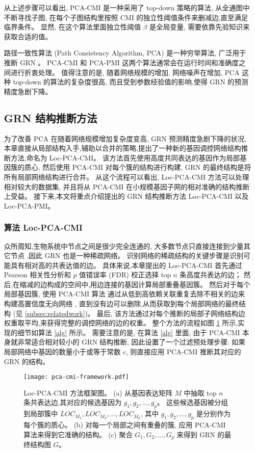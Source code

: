 从上述步骤可以看出, PCA-CMI 是一种采用了 top-down 策略的算法, 
从全通图中不断寻找子图, 在每个子图结构里按照 CMI 的独立性阈值条件来删减边,直至满足临界条件。
显然, 在这个算法里面独立性阈值 $\beta$ 是全局变量, 需要依靠先验知识来获取合适的值。

路径一致性算法 (Path Consistency Algorithm, PCA) 是一种穷举算法, 
广泛用于推断 GRN 。
PCA-CMI 和 PCA-PMI 这两个算法通常会在运行时间和准确度之间进行折衷处理。
值得注意的是, 
随着网络规模的增加, 网络噪声在增加,
PCA 这种 top-down 的算法的复杂度很高, 而且受到参数经验值的影响,使得 GRN 的预测精度急剧下降。

\subsection{GRN 结构推断方法}
为了改善 PCA 在随着网络规模增加复杂度变高, GRN 预测精度急剧下降的状况, 
本章直接从局部结构入手,辅助以合并的策略,提出了一种新的基因调控网络结构推断方法,命名为 Loc-PCA-CMI。
该方法首先使用高度共同表达的基因作为局部基因簇的质心,
然后使用 PCA-CMI 对每个簇的结构进行构建, GRN 的最终结构是将所有局部网络结构进行合并。
从这个流程可以看出, Loc-PCA-CMI 方法可以处理相对较大的数据集,
并且将从 PCA-CMI 在小规模基因子网的相对准确的结构推断上受益。
接下来,本文将重点介绍提出的 GRN 结构推断方法 Loc-PCA-CMI 以及 Loc-PCA-PMI。

\subsubsection{算法 Loc-PCA-CMI}

众所周知,生物系统中节点之间是很少完全连通的,
大多数节点只直接连接到少量其它节点 ,因此 GRN 也是一种稀疏网络。
识别网络的稀疏结构的关键步骤是识别可能具有相对高的共表达值的边。
具体来说,本章提出的 Loc-PCA-CMI 首先通过 Pearson 相关性分析和 $p$ 值错误率 (FDR) 校正选择 top $n$ 条高度共表达的边；
然后,在缩减的边构成的空间中,用边连接的基因计算局部重叠基因簇。
然后对于每个局部基因簇, 使用 PCA-CMI 算法  通过从低到高依赖关联重复去除不相关的边来构建高置信度无向网络 ,
直到没有边可以删除,从而获取到每个局部网络的最终结构 (见 \ref{subsec:relatedwork})。
最后, 该方法通过对每个推断的局部子网络结构边权重取平均,来获得完整的调控网络的边的权重。
整个方法的流程如图 \ref{pca-cmi-fr} 所示,实现的细节如算法 \ref{alg} 所示。
需要注意的是,
在算法 \ref{alg} 里面,
由于 PCA-CMI 本身就非常适合相对较小的 GRN 结构推断,
因此设置了一个过滤预处理步骤: 如果局部网络中基因的数量小于或等于常数 $c$,
则直接应用 PCA-CMI 推断其对应的 GRN 的结构。
\begin{figure}[!htbp]
    \centering
    \texttt{[image: pca-cmi-framework.pdf]}
    \caption{Loc-PCA-CMI 方法框架图。
    (a) 从基因表达矩阵 $M$ 中抽取 top $n$ 条共表达边,其对应的候选基因为 $g_1,g_2,\ldots,g_{p} $。
    这些候选基因被分组到局部簇中 $LOC_{M_1}, LOC_{M_2},\ldots,LOC_{M_{p}}$,
    其中 $g_1,g_2,\ldots,g_{p}$ 是分别作为每个簇的质心。
    (b) 对每一个局部之间有重叠的簇, 应用 PCA-CMI 算法来得到它准确的结构。
    (c) 聚合 $G_1, G_2, \ldots, G_p$ 来得到 GRN 的最终结构图 $G$。
    }
    \label{pca-cmi-fr}
\end{figure}

